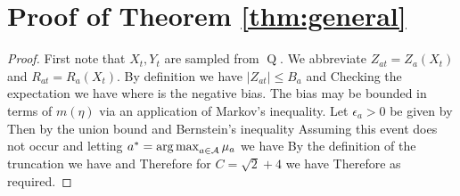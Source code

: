 \section{Proof of Theorem \ref{thm:general}}\label{sec:thm:general}

\begin{proof}
First note that $X_t, Y_t$ are sampled from $\operatorname{Q}$.
We abbreviate $Z_{at} = Z_a(X_t)$ and $R_{at} = R_a(X_t)$.
By definition we have $|Z_{at}| \leq B_a$ and 
Checking the expectation we have
where 
is the negative bias. 
The bias may be bounded in terms of $m(\eta)$ via an application of Markov's inequality.
Let $\epsilon_a > 0$ be given by
Then by the union bound and Bernstein's inequality 
Assuming this event does not occur and letting $a^* = \argmax_{a \in \calA} \mu_a$ we have
By the definition of the truncation
we have
and
Therefore for $C = \sqrt{2} + 4$ we have
Therefore
as required.
\end{proof}





